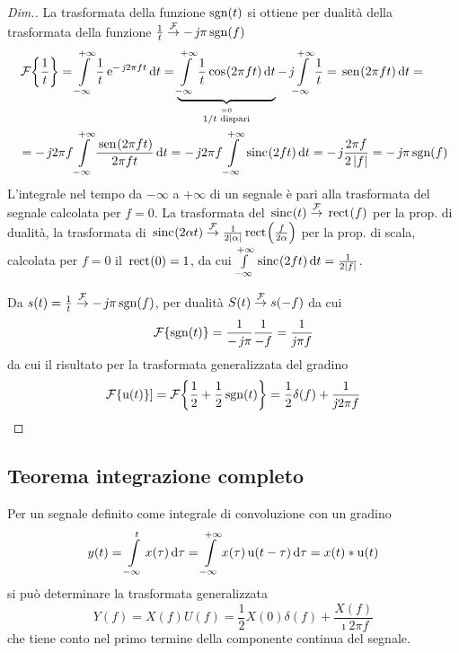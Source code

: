 \begin{proof}[Dim.]
La trasformata della funzione $\operatorname{sgn}(t)$ si ottiene per dualità della trasformata della funzione $\frac{1}{t}\overset{\operatorname{\mathcal{F}}}{\to}-\operatorname{\mathit{j}\!}\pi\operatorname{sgn}(f)$
\[\begin{split}&\fourier{\frac{1}{t}}=\intinf{\frac{1}{t}\e{-\imath 2\pi f t}}{t}= \underbrace{\intinf{\frac{1}{t}\cos{2\pi f t}}{t}}_{\stackrel{=0}{1/t \text{ dispari}}} -\imath\intinf{\frac{1}{t}=\sen{2\pi f t}}{t}=\\
&=-\imath 2\pi f\intinf{\frac{\sen{2\pi f t}}{2\pi f t}}{t}=-\imath 2\pi f\intinf{\sinc{2 f t}}{t}= -\imath\frac{2\pi f}{2\abs{f}} = -\imath\pi\sgn(f)
\end{split} \]
L'integrale nel tempo da $-\infty$ a $+\infty$ di un segnale è pari alla trasformata del segnale calcolata per $f=0$. La trasformata del $\,{\operatorname{sinc}}^{}\!\left({t}\right)\overset{\operatorname{\mathcal{F}}}{\to}\,{\operatorname{rect}}^{}\!\left({f}\right)$ per la prop. di dualità, la trasformata di $\,{\operatorname{sinc}}^{}\!\left({2\alpha t}\right)\overset{\operatorname{\mathcal{F}}}{\to}\frac{1}{2\left|{\alpha}\right|}\,{\operatorname{rect}}^{}\!\left({\frac{f}{2\alpha}}\right)$ per la prop. di scala, calcolata per $f=0$ il $\,{\operatorname{rect}}^{}\!\left({0}\right)=1$, da cui
$\int\limits_{-\infty}^{+\infty}{\,{\operatorname{sinc}}^{}\!\left({2 f t}\right)}{\,\mathop{}\!\mathrm{d}{t}}=\frac{1}{2\left|{f}\right|}$.

Da $s(t)=\frac{1}{t}\overset{\operatorname{\mathcal{F}}}{\to} -\operatorname{\mathit{j}\!}\pi\operatorname{sgn}(f)$, per dualità $S(t)\overset{\operatorname{\mathcal{F}}}{\to} s(-f)$ da cui \[\operatorname{\mathcal{F}}\!\left\lbrace{\operatorname{sgn}(t)}\right\rbrace=\frac{1}{-\operatorname{\mathit{j}\!}\pi}\frac{1}{-f}=\frac{1}{\operatorname{\mathit{j}\!}\pi f}\] da cui il risultato per la trasformata generalizzata del gradino \[\operatorname{\mathcal{F}}\!\left\lbrace{\operatorname{u}(t)}\right\rbrace]=\operatorname{\mathcal{F}}\!\left\lbrace{\frac{1}{2}+\frac{1}{2}\operatorname{sgn}(t)}\right\rbrace=\frac{1}{2}\delta(f)+\frac{1}{\operatorname{\mathit{j}\!} 2\pi f}\]
\end{proof}

\subsection{Teorema integrazione completo}
Per un segnale definito come integrale di convoluzione con un gradino
\[y(t)=\int\limits_{-\infty}^{t}{x(\tau)}{\,\mathop{}\!\mathrm{d}{\tau}}=\int\limits_{-\infty}^{+\infty}{x(\tau)\operatorname{u}(t-\tau)}{\,\mathop{}\!\mathrm{d}{\tau}}=x(t)\ast\operatorname{u}(t)\]
si può determinare la trasformata generalizzata
\begin{equation}
Y(f)=X(f) U(f)=\frac{1}{2} X(0) \delta(f) + \frac{X(f)}{\imath 2\pi f}
\end{equation}
che tiene conto nel primo termine della componente continua del segnale.

